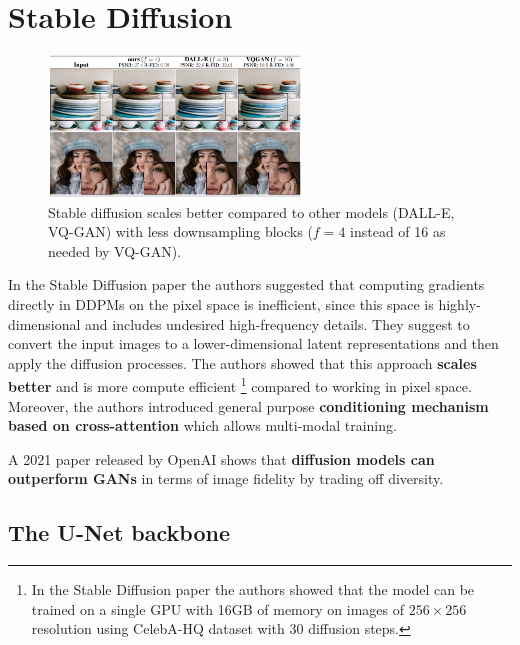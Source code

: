 \section{Stable Diffusion}
\label{sec:stable_diffusion}


\begin{figure}
    \centering
    \includegraphics[width=0.6\textwidth]{images/diffusion_models/stable_diffusion/stable_diffusion.png}
    \caption{Stable diffusion scales better compared to other models \cite{stable_diffusion} (DALL-E, VQ-GAN) with less downsampling blocks ($f = 4$ instead of 16 as needed by VQ-GAN).}
\end{figure}


In the Stable Diffusion paper \cite{stable_diffusion} the authors suggested that computing gradients directly in DDPMs on the pixel space is inefficient, since this space is highly-dimensional and includes undesired high-frequency details. They suggest to convert the input images to a lower-dimensional latent representations and then apply the diffusion processes. The authors showed that this approach \textbf{scales better} and is more compute efficient \footnote{In the Stable Diffusion paper \cite{stable_diffusion} the authors showed that the model can be trained on a single GPU with 16GB of memory on images of $256\times 256$ resolution using CelebA-HQ dataset with 30 diffusion steps.} compared to working in pixel space. Moreover, the authors introduced general purpose \textbf{conditioning mechanism based on cross-attention} which allows multi-modal training.

A 2021 paper released by OpenAI \cite{openai_diffusion_beats_gans} shows that \textbf{diffusion models can outperform GANs} in terms of image fidelity by trading off diversity.











\subsection{The U-Net backbone}
\label{subsec:stable_diffusion_u_net_backbone}

